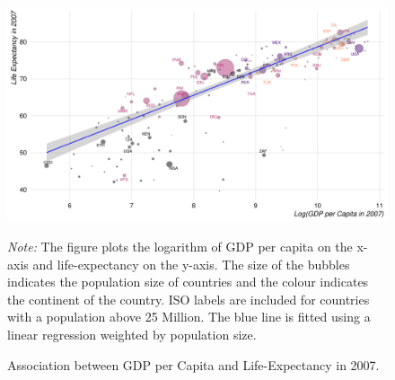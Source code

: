 
\lipsum[1-1]

\citep{bertrand2021improving}

\begin{figure}[!htb]
    \begin{center}
    \includegraphics[width=\linewidth]{figures/gapminder_plot.pdf}
    \end{center}
    \caption{Association between GDP per Capita and Life-Expectancy in 2007.}
    \label{fig:gapminder}
    \begin{singlespace}
        \scriptsize{\textit{Note:} The figure plots the logarithm of GDP per capita on the x-axis and life-expectancy on the y-axis. The size of the bubbles indicates the population size of countries and the colour indicates the continent of the country. ISO labels are included for countries with a population above 25 Million. The blue line is fitted using a linear regression weighted by population size.}
    \end{singlespace}
\end{figure}

\lipsum[1-6] 
\citet{black2013under}
